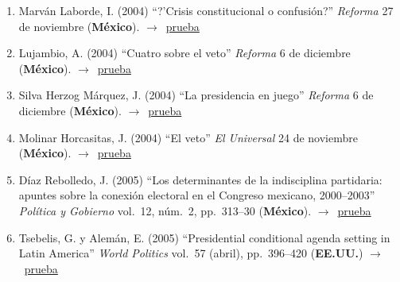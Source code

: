 \documentclass[12 pt, letter]{article}
\newenvironment{CitasMiTrabajo}{
    \begin{footnotesize}
    \begin{enumerate}[label={\footnotesize\emph{cita~\arabic*}},ref=\arabic*] %
        \setlength{\itemsep}{.1\itemsep}
        \setlength{\parskip}{.1\parskip}
    }{\end{enumerate}\end{footnotesize}}
\begin{document}

        \begin{CitasMiTrabajo}

        \item Marv\'an Laborde, I. (2004)
        ``?'Crisis constitucional o confusi\'on?'' \emph{Reforma} 27 de noviembre (\textbf{M\'exico}). $\rightarrow$~\href{http://ericmagar.com/cv/cites/magarWeldonVeto/marvan.pdf}{prueba}

        \item Lujambio, A. (2004) ``Cuatro sobre el veto''
        \emph{Reforma} 6 de diciembre (\textbf{M\'exico}). $\rightarrow$~\href{http://ericmagar.com/cv/cites/magarWeldonVeto/luj.pdf}{prueba}

        \item Silva Herzog M\'arquez, J. (2004) ``La presidencia en
        juego'' \emph{Reforma} 6 de diciembre (\textbf{M\'exico}). $\rightarrow$~\href{http://ericmagar.com/cv/cites/magarWeldonVeto/jshm.pdf}{prueba}

        \item Molinar Horcasitas, J. (2004)
        ``El veto'' \emph{El Universal} 24 de noviembre (\textbf{M\'exico}). $\rightarrow$~\href{http://ericmagar.com/cv/cites/magarWeldonVeto/moli.pdf}{prueba}

        \item D\'iaz Rebolledo, J. (2005)
        ``Los determinantes de la indisciplina partidaria: apuntes sobre la conexi\'on electoral en el Congreso mexicano, 2000--2003''
        \emph{Pol\'itica y Gobierno} vol.\ 12, n\'um.\ 2, pp.\ 313--30 (\textbf{M\'exico}). $\rightarrow$~\href{http://ericmagar.com/cv/cites/magarWeldonVeto/diazrebolledo2005pyg.pdf}{prueba}

        \item Tsebelis, G. y Alem\'an, E. (2005)
        ``Presidential conditional agenda setting in Latin America'' \emph{World Politics} vol.\ 57 (abril), pp.\ 396--420 (\textbf{EE.UU.}) $\rightarrow$~\href{http://ericmagar.com/cv/cites/magarWeldonVeto/tsebal.pdf}{prueba}


\end{CitasMiTrabajo}
\end{document}

